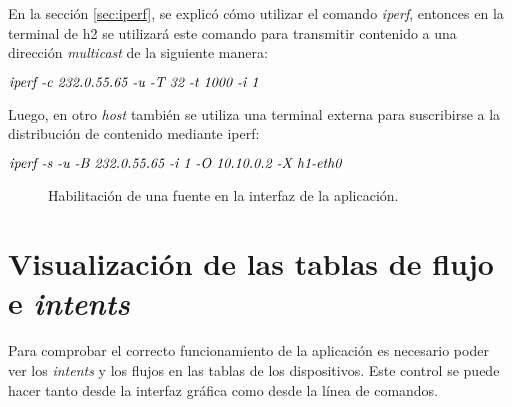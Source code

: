En la sección \ref{sec:iperf}, se explicó cómo utilizar el comando \textit{iperf}, entonces en la terminal de h2 se utilizará este comando para transmitir contenido a una dirección \textit{multicast} de la siguiente manera:
\begin{center}
    $ \emph {iperf -c 232.0.55.65 -u -T 32 -t 1000 -i 1}$
\end{center}
Luego, en otro \textit{host} también se utiliza una terminal externa para suscribirse a la distribución de contenido mediante iperf:
\begin{center}
    $ \emph {iperf -s -u -B 232.0.55.65 -i 1 -O 10.10.0.2 -X h1-eth0}$
\end{center}
\begin{figure}[th]
	\centering 
	\caption[Habilitación de una fuente en la interfaz de la aplicación]{Habilitación de una fuente en la interfaz de la aplicación.}
	\label{fig:sourceenable}
\end{figure}


\section{Visualización de las tablas de flujo e \textit{intents}}
Para comprobar el correcto funcionamiento de la aplicación es necesario poder ver los \textit{intents} y los flujos en las tablas de los dispositivos. Este control se puede hacer tanto desde la interfaz gráfica como desde la línea de comandos.

